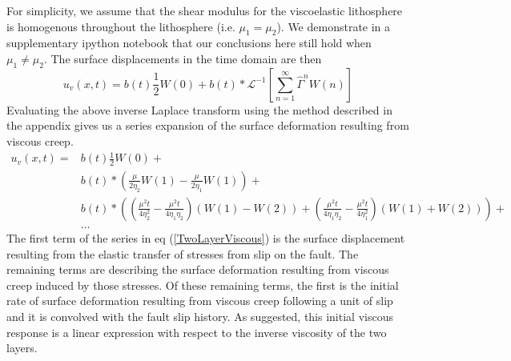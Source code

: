 \documentclass[12pt]{article}
\begin{document}
For simplicity, we assume that the shear modulus for the viscoelastic
lithosphere is homogenous throughout the lithosphere (i.e. $\mu_1 =
\mu_2$).  We demonstrate in a supplementary ipython notebook that our
conclusions here still hold when $\mu_1 \neq \mu_2$.  The surface
displacements in the time domain are then 
\begin{equation}
 u_v(x,t) = b(t)\frac{1}{2}W(0) + 
            b(t)\ast\mathcal{L}^{-1}\left[\sum_{n=1}^\infty\hat{\Gamma}^{n}W(n)\right]
\end{equation}
Evaluating the above inverse Laplace transform using the method
described in the appendix gives us a series expansion of the surface
deformation resulting from viscous creep.
\begin{align}\label{TwoLayerViscous}
  u_v(x,t) = &b(t)\frac{1}{2}W(0) +\nonumber\\
             &b(t)\ast\left(\frac{\mu}{2\eta_2}W(1) - \frac{\mu}{2\eta_1}W(1)\right) +\nonumber\\
             &b(t)\ast\left(\left(\frac{\mu^2t}{4\eta_2^2} -
                  \frac{\mu^2t}{4\eta_1\eta_2}\right) \left(W(1) - W(2)\right) +
                  \left(\frac{\mu^2t}{4\eta_1\eta_2} - \frac{\mu^2t}{4\eta_1^2}\right)
                  \left(W(1) + W(2)\right)\right) + \nonumber\\ 
             &\dots
\end{align} 
The first term of the series in eq (\ref{TwoLayerViscous}) is the
surface displacement resulting from the elastic transfer of stresses
from slip on the fault.  The remaining terms are describing the
surface deformation resulting from viscous creep induced by those
stresses. Of these remaining terms, the first is the initial rate of
surface deformation resulting from viscous creep following a unit of
slip and it is convolved with the fault slip history.  As suggested,
this initial viscous response is a linear expression with
respect to the inverse viscosity of the two layers.
\end{document}
